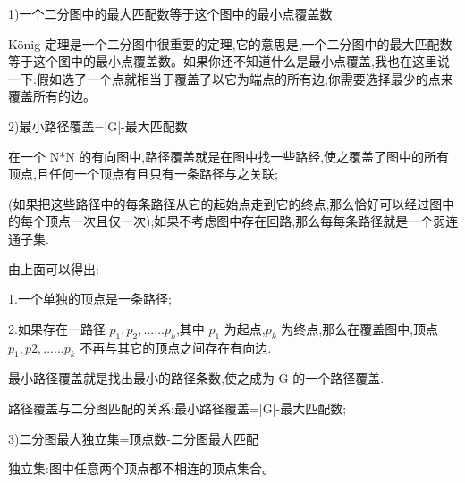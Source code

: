 1)一个二分图中的最大匹配数等于这个图中的最小点覆盖数

König 定理是一个二分图中很重要的定理,它的意思是,一个二分图中的最大匹配数等于这个图中的最小点覆盖数。如果你还不知道什么是最小点覆盖,我也在这里说一下:假如选了一个点就相当于覆盖了以它为端点的所有边,你需要选择最少的点来覆盖所有的边。

2)最小路径覆盖=|G|-最大匹配数

在一个 N*N 的有向图中,路径覆盖就是在图中找一些路经,使之覆盖了图中的所有顶点,且任何一个顶点有且只有一条路径与之关联;

(如果把这些路径中的每条路径从它的起始点走到它的终点,那么恰好可以经过图中的每个顶点一次且仅一次);如果不考虑图中存在回路,那么每每条路径就是一个弱连通子集.

由上面可以得出:

1.一个单独的顶点是一条路径;

2.如果存在一路径 $p_1,p_2,......p_k$,其中 $p_1$ 为起点,$p_k$ 为终点,那么在覆盖图中,顶点 $p_1,p2,......p_k$ 不再与其它的顶点之间存在有向边.

最小路径覆盖就是找出最小的路径条数,使之成为 G 的一个路径覆盖.

路径覆盖与二分图匹配的关系:最小路径覆盖=|G|-最大匹配数;

3)二分图最大独立集=顶点数-二分图最大匹配

独立集:图中任意两个顶点都不相连的顶点集合。
